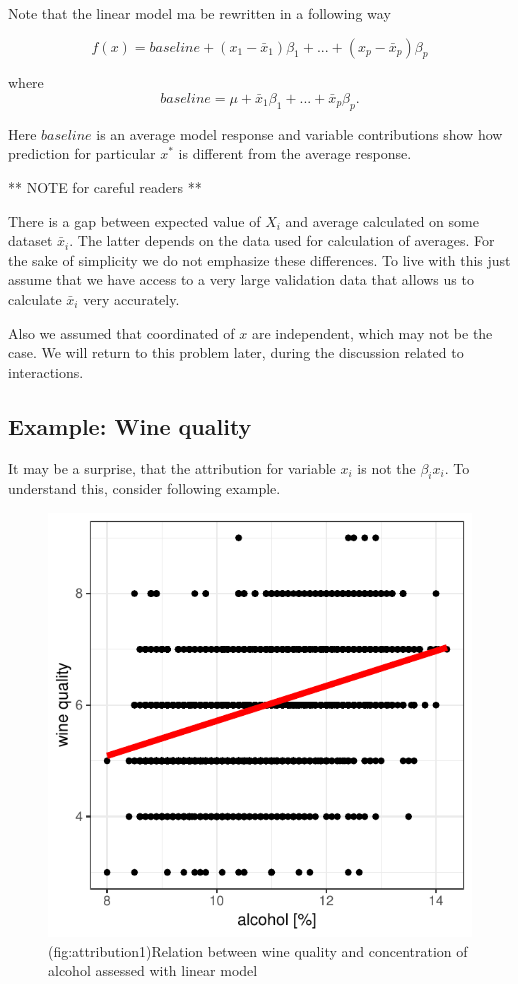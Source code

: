 \documentclass[]{krantz}
\theoremstyle{definition}
\theoremstyle{definition}
\theoremstyle{definition}
\theoremstyle{remark}
\begin{document}
Note that the linear model ma be rewritten in a following way

\[
f(x) = baseline + (x_1 - \bar x_1) \beta_1 + ... + (x_p - \bar x_p) \beta_p
\]

where \[
baseline = \mu + \bar x_1 \beta_1 + ... + \bar x_p \beta_p.
\]

Here \(baseline\) is an average model response and variable
contributions show how prediction for particular \(x^*\) is different
from the average response.

** NOTE for careful readers **

There is a gap between expected value of \(X_i\) and average calculated
on some dataset \(\bar x_i\). The latter depends on the data used for
calculation of averages. For the sake of simplicity we do not emphasize
these differences. To live with this just assume that we have access to
a very large validation data that allows us to calculate \(\bar x_i\)
very accurately.

Also we assumed that coordinated of \(x\) are independent, which may not
be the case. We will return to this problem later, during the discussion
related to interactions.

\hypertarget{example-wine-quality}{%
\subsection{Example: Wine quality}\label{example-wine-quality}}

It may be a surprise, that the attribution for variable \(x_i\) is not
the \(\beta_i x_i\). To understand this, consider following example.

\begin{figure}

{\centering \includegraphics[width=0.5\linewidth]{figure/attribution_1} 

}

\caption{(fig:attribution1)Relation between wine quality and concentration of alcohol assessed with linear model}\label{fig:attribution1}
\end{figure}
\end{document}
